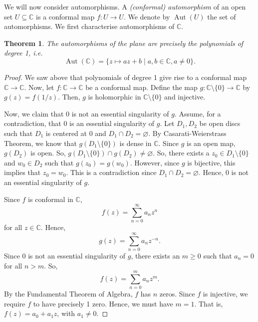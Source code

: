 \documentclass[a4paper, openany]{memoir}
\theoremstyle{definition}
\theoremstyle{plain}
\newtheorem{theorem}[definition]{Theorem}
\begin{document}
    We will now consider automorphisms. A \emph{(conformal) automorphism} of an open set $U \subseteq \mathbb{C}$ is a conformal map $f \colon U \to U$. We denote by $\operatorname{Aut}(U)$ the set of automorphisms. We first characterise automorphisms of $\mathbb{C}$.
    \begin{theorem}
        The automorphisms of the plane are precisely the polynomials of degree 1, i.e.
        \[\operatorname{Aut}(\mathbb{C}) = \{z \mapsto az + b \mid a, b \in \mathbb{C}, a \neq 0\}.\]
    \end{theorem}
    \begin{proof}
        We saw above that polynomials of degree 1 give rise to a conformal map $\mathbb{C} \to \mathbb{C}$. Now, let $f \colon \mathbb{C} \to \mathbb{C}$ be a conformal map. Define the map $g \colon \mathbb{C} \setminus \{0\} \to \mathbb{C}$ by $g(z) = f(1/z)$. Then, $g$ is holomorphic in $\mathbb{C} \setminus \{0\}$ and injective.

        Now, we claim that $0$ is not an essential singularity of $g$. Assume, for a contradiction, that 0 is an essential singularity of $g$. Let $D_1, D_2$ be open discs such that $D_1$ is centered at 0 and $D_1 \cap D_2 = \varnothing$. By Casarati-Weierstrass Theorem, we know that $g(D_1 \setminus \{0\})$ is dense in $\mathbb{C}$. Since $g$ is an open map, $g(D_2)$ is open. So, $g(D_1 \setminus \{0\}) \cap g(D_2) \neq \varnothing$. So, there exists a $z_0 \in D_1 \setminus \{0\}$ and $w_0 \in D_2$ such that $g(z_0) = g(w_0)$. However, since $g$ is bijective, this implies that $z_0 = w_0$. This is a contradiction since $D_1 \cap D_2 = \varnothing$. Hence, $0$ is not an essential singularity of $g$.

        Since $f$ is conformal in $\mathbb{C}$,
        \[f(z) = \sum_{n=0}^\infty a_n z^n\]
        for all $z \in \mathbb{C}$. Hence,
        \[g(z) = \sum_{n=0}^\infty a_n z^{-n}.\]
        Since $0$ is not an essential singularity of $g$, there exists an $m \geq 0$ such that $a_n = 0$ for all $n > m$. So,
        \[f(z) = \sum_{n=0}^m a_n z^m.\]
        By the Fundamental Theorem of Algebra, $f$ has $n$ zeros. Since $f$ is injective, we require $f$ to have precisely 1 zero. Hence, we must have $m = 1$. That is, $f(z) = a_0 + a_1 z$, with $a_1 \neq 0$.
    \end{proof}
\end{document}
